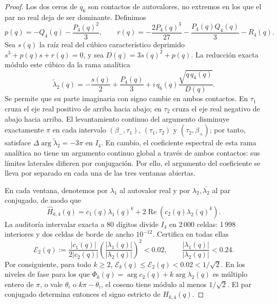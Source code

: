 \documentclass[11pt,a4paper]{article}
\theoremstyle{definition}
\begin{document}
\begin{proof}
Los dos ceros de $q_6$ son contactos de autovalores, no extremos en los
que el par no real deja de ser dominante. Definimos
\[
p(q)=-Q_4(q)-\frac{P_4(q)^2}{3},\qquad
r(q)=-\frac{2P_4(q)^3}{27}-\frac{P_4(q)Q_4(q)}3-R_4(q).
\]
Sea $s(q)$ la raíz real del cúbico característico deprimido
$s^3+p(q)s+r(q)=0$, y sea
$D(q)=3s(q)^2+p(q)$. La reducción exacta módulo este cúbico da la rama
analítica
\[
\widetilde\lambda_2(q)
=-\frac{s(q)}2+\frac{P_4(q)}3
+i\,q_6(q)\frac{\sqrt{q\,q_4(q)}}{D(q)}.
\]
Se permite que su parte imaginaria con signo cambie en ambos contactos.
En $\tau_1$ cruza el eje real positivo de arriba hacia abajo; en
$\tau_2$ cruza el eje real negativo de abajo hacia arriba. El
levantamiento continuo del argumento disminuye exactamente $\pi$ en
cada intervalo $(\beta_-,\tau_1)$, $(\tau_1,\tau_2)$ y
$(\tau_2,\beta_+)$; por tanto, satisface
$\Delta\arg\widetilde\lambda_2=-3\pi$ en $I_4$. En cambio, el
coeficiente espectral de esta rama analítica no tiene un argumento
continuo global a través de ambos contactos: sus límites laterales
difieren por conjugación. Por ello, el argumento del coeficiente se
lleva por separado en cada una de las tres ventanas abiertas.

En cada ventana, denotemos por $\lambda_1$ al autovalor real y por
$\lambda_2,\overline{\lambda_2}$ al par conjugado, de modo que
\[
\widehat H_{k,4}(q)=c_1(q)\lambda_1(q)^k
+2\operatorname{Re}\!\left(c_2(q)\lambda_2(q)^k\right).
\]
La auditoría intervalar exacta a 80 dígitos divide $I_4$ en 2\,000
celdas: 1\,998 interiores y dos celdas de borde de ancho $10^{-12}$.
Certifica en todas ellas
\[
\mathcal E_2(q):=
\frac{|c_1(q)|}{2|c_2(q)|}
\left(\frac{|\lambda_1(q)|}{|\lambda_2(q)|}\right)^2<0.02,
\qquad
\frac{|\lambda_1(q)|}{|\lambda_2(q)|}<0.24.
\]
Por consiguiente, para todo $k\ge2$,
$\mathcal E_k(q)\le\mathcal E_2(q)<0.02<1/\sqrt2$. En los niveles
de fase para los que
$\Phi_k(q)=\arg c_2(q)+k\arg\lambda_2(q)$ es múltiplo entero de $\pi$,
o vale $\theta_i$ o $k\pi-\theta_i$, el coseno tiene módulo al menos
$1/\sqrt2$. El par conjugado determina entonces el signo estricto de
$H_{k,4}(q)$.


\end{proof}
\end{document}
